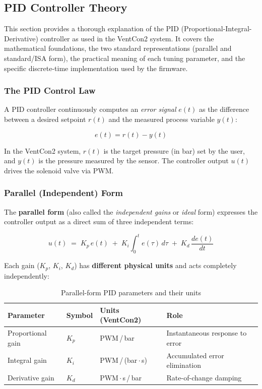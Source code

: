 \documentclass[12pt,a4paper]{article}
\begin{document}
\subsection{PID Controller Theory}
\label{sec:pid-theory}

This section provides a thorough explanation of the PID (Proportional-Integral-Derivative) controller as used in the VentCon2 system. It covers the mathematical foundations, the two standard representations (parallel and standard/ISA form), the practical meaning of each tuning parameter, and the specific discrete-time implementation used by the firmware.

\subsubsection{The PID Control Law}

A PID controller continuously computes an \emph{error signal} $e(t)$ as the difference between a desired setpoint $r(t)$ and the measured process variable $y(t)$:

\begin{equation}
    e(t) = r(t) - y(t)
\end{equation}

In the VentCon2 system, $r(t)$ is the target pressure (in bar) set by the user, and $y(t)$ is the pressure measured by the sensor. The controller output $u(t)$ drives the solenoid valve via PWM.

\subsubsection{Parallel (Independent) Form}
\label{sec:parallel-form}

The \textbf{parallel form} (also called the \emph{independent gains} or \emph{ideal} form) expresses the controller output as a direct sum of three independent terms:

\begin{equation}
    \boxed{u(t) \;=\; K_p \, e(t) \;+\; K_i \!\int_0^t e(\tau)\,d\tau \;+\; K_d \,\frac{de(t)}{dt}}
    \label{eq:pid-parallel}
\end{equation}

Each gain ($K_p$, $K_i$, $K_d$) has \textbf{different physical units} and acts completely independently:

\begin{table}[H]
\centering
\caption{Parallel-form PID parameters and their units}
\label{tab:pid-parallel-params}
\begin{tabular}{llll}
\toprule
\textbf{Parameter} & \textbf{Symbol} & \textbf{Units (VentCon2)} & \textbf{Role} \\
\midrule
Proportional gain & $K_p$ & PWM\,/\,bar & Instantaneous response to error \\
Integral gain     & $K_i$ & PWM\,/\,(bar\,$\cdot$\,s) & Accumulated error elimination \\
Derivative gain   & $K_d$ & PWM\,$\cdot$\,s\,/\,bar & Rate-of-change damping \\
\bottomrule
\end{tabular}
\end{table}
\end{document}
